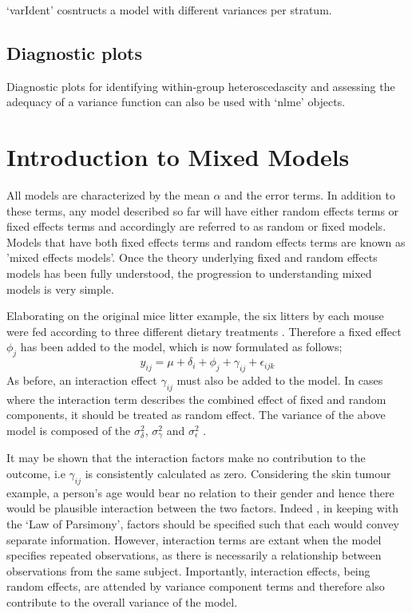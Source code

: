 \documentclass[12pt, a4paper]{report}
\theoremstyle{plain}
\theoremstyle{definition}
\theoremstyle{remark}
\begin{document}
`varIdent' cosntructs a model with different variances per stratum.

\subsection{Diagnostic plots}
Diagnostic plots for identifying within-group heteroscedascity and assessing the adequacy of a variance function can also be used with `nlme' objects.



\section{Introduction to Mixed Models}


All models are characterized by the mean $\alpha$ and the error
terms. In addition to these terms, any model described so far will
have either random effects terms or fixed effects terms and
accordingly are referred to as random or fixed models. Models that
have both fixed effects terms and random effects terms are known
as 'mixed effects models'. Once the theory underlying fixed and
random effects models has been fully understood, the progression
to understanding mixed models is very simple.

Elaborating on the original mice litter example, the six litters
by each mouse were fed according to three different dietary
treatments \citep{Searle}. Therefore a fixed effect $\phi_{j}$ has
been added to the model, which is now formulated as follows;
\begin{equation}
y_{ij} = \mu + \delta_{i} + \phi_{j} + \gamma_{ij} +
\epsilon_{ijk}
\end{equation}
As before, an interaction effect $\gamma_{ij}$ must also be added
to the model. In cases where the interaction term describes the
combined effect of fixed and random components, it should be
treated as random effect. The variance of the above model is
composed of the $\sigma^{2}_{\delta}$, $\sigma^{2}_{\gamma}$ and
$\sigma^{2}_{\epsilon}$ .


It may be shown that the interaction factors make no contribution
to the outcome, i.e $\gamma_{ij}$ is consistently calculated as
zero. Considering the skin tumour example, a person's age would
bear no relation to their gender and hence there would be
plausible interaction between the two factors. Indeed , in keeping
with the `Law of Parsimony', factors should be specified such that
each would convey separate information. However, interaction terms
are extant when the model specifies repeated observations, as
there is necessarily a relationship between observations from the
same subject. Importantly, interaction effects, being random
effects, are attended by variance component terms and therefore
also contribute to the overall variance of the model.
\end{document}
